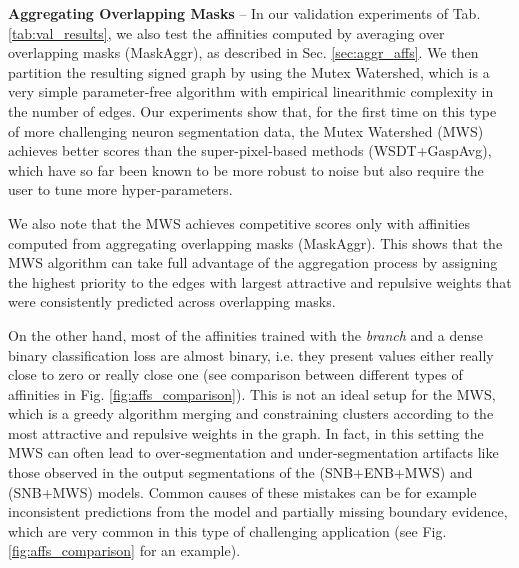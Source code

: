 \textbf{Aggregating Overlapping Masks}  -- 
In our validation experiments of Tab. \ref{tab:val_results}, we also test the affinities computed by averaging over overlapping masks (MaskAggr), as described in Sec. \ref{sec:aggr_affs}. We then partition the resulting signed graph by using the Mutex Watershed, which is a very simple parameter-free algorithm with empirical linearithmic complexity in the number of edges. 
Our experiments show that, for the first time on this type of more challenging neuron segmentation data, the Mutex Watershed (MWS) achieves better scores than the super-pixel-based methods (WSDT+GaspAvg), which have so far been known to be more robust to noise but also require the user to tune more hyper-parameters.   

We also note that the MWS achieves competitive scores only with affinities computed from aggregating overlapping masks (MaskAggr).
This shows that the MWS algorithm can take full advantage of the \maskname aggregation process by assigning the highest priority to the edges with largest attractive and repulsive weights that were consistently predicted across overlapping masks.

On the other hand, most of the affinities trained with the \emph{\sparseBr} \linebreak \emph{branch} and a dense binary classification loss are almost binary, i.e. they present values either really close to zero or really close one (see comparison between different types of affinities in Fig. \ref{fig:affs_comparison}).
This is not an ideal setup for the MWS, which is a greedy algorithm merging and constraining clusters according to the most attractive and repulsive weights in the graph.
In fact, in this setting the MWS can often lead to over-segmentation and under-segmentation artifacts like those observed in the output segmentations of the (SNB+ENB+MWS) and (SNB+MWS) models. Common causes of these mistakes can be for example inconsistent predictions from the model and partially missing boundary evidence, which are very common in this type of challenging application (see Fig. \ref{fig:affs_comparison} for an example). 

